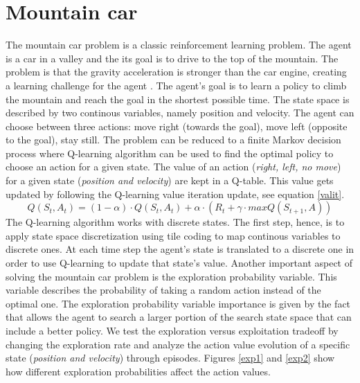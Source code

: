 \documentclass[runningheads]{llncs}
\begin{document}
\section{Mountain car}
The mountain car problem is a classic reinforcement learning
problem. The agent is a car in a valley and the its goal is to drive
to the top of the mountain. The problem is that the gravity
acceleration is stronger than the car engine, creating a learning
challenge for the agent \cite{rlbook}. The agent's goal is to learn
a policy to climb the mountain and reach the goal in the shortest
possible time. The state space is described by two continous
variables, namely position and velocity. The agent can choose between
three actions: move right (towards the goal), move left (opposite
to the goal), stay still. The problem can be reduced to a finite
Markov decision process where Q-learning algorithm can be used to
find the optimal policy to choose an action for a given state. The
value of an action (\textit{right, left, no move}) for a given state
(\textit{position and velocity}) are kept in a Q-table. This value gets
updated by following the Q-learning value iteration update, see equation \ref{valit}.
\begin{equation}\label{valit}
Q(S_t, A_t) = (1 - \alpha) \cdot Q(S_t, A_t) + \alpha \cdot (R_t + \gamma
\cdot maxQ(S_{t+1}, A)) 
\end{equation}
The Q-learning algorithm works with discrete states. The first step,
hence, is to apply state space discretization using tile coding to map
continous variables to discrete ones. At each time step the agent's
state is translated to a discrete one in order to use Q-learning to
update that state's value. Another important aspect of solving the
mountain car problem is the exploration probability variable. This
variable describes the probability of taking a random action instead of
the optimal one. The exploration probability variable importance is
given by the fact that allows the agent to search a larger portion of
the search state space that can include a better policy. We test the
exploration versus exploitation tradeoff by changing the
exploration rate and analyze the action value evolution of a specific state
(\textit{position and velocity}) through episodes. Figures \ref{exp1} and
\ref{exp2} show how different exploration probabilities affect the
action values. 
\end{document}
